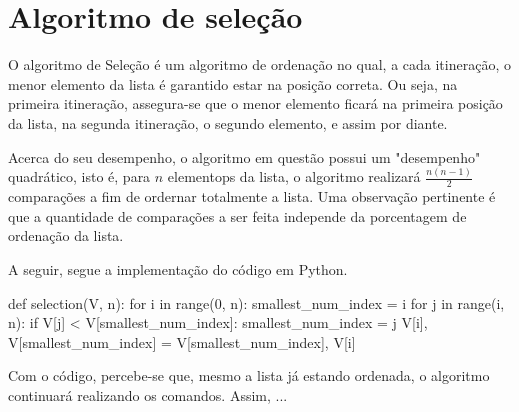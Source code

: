 \section{Algoritmo de seleção}
O algoritmo de Seleção é um algoritmo de ordenação no qual, a cada itineração, o menor elemento da lista é garantido estar na posição correta. Ou seja, na primeira itineração, assegura-se que o menor elemento ficará na primeira posição da lista, na segunda itineração, o segundo elemento, e assim por diante. 
\vspace{\baselineskip}

Acerca do seu desempenho, o algoritmo em questão possui um "desempenho" quadrático, isto é, para $n$ elementops da lista, o algoritmo realizará $\frac{n(n-1)}{2}$ comparações a fim de ordernar totalmente a lista. Uma observação pertinente é que a quantidade de comparações a ser feita independe da porcentagem de ordenação da lista.

A seguir, segue a implementação do código em Python.

\begin{python}
def selection(V, n):
    for i in range(0, n):
        smallest_num_index = i
        for j in range(i, n):
            if V[j] < V[smallest_num_index]:
                smallest_num_index = j
        V[i], V[smallest_num_index] = V[smallest_num_index], V[i]

\end{python}

Com o código, percebe-se que, mesmo a lista já estando ordenada, o algoritmo continuará realizando os comandos. Assim, ...